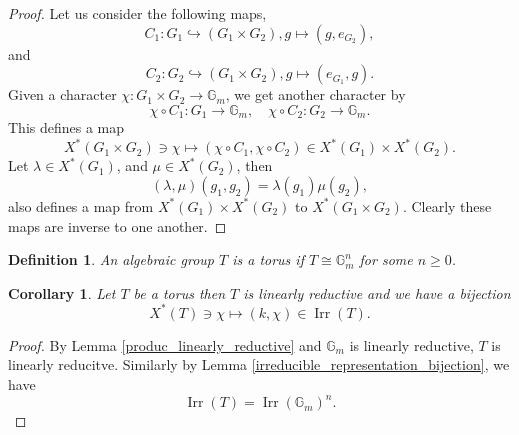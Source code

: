 \documentclass[10pt]{article}
\newtheorem{definition}{Definition}[section]
\newtheorem{corollary}{Corollary} [section]
\numberwithin{equation}{theorem}
\DeclareMathOperator{\Irr}{Irr}
\newcommand{\G}[0]{\mathbb{G}}
\begin{document}
\begin{proof}
  Let us consider the following maps,
  \begin{equation*}
    C_1:G_1\hookrightarrow(G_1\times G_2), g\mapsto (g,e_{G_2}),
  \end{equation*}
  and 
  \begin{equation*}
    C_2:G_2\hookrightarrow(G_1\times G_2), g\mapsto (e_{G_1},g).
  \end{equation*}
  Given a character $\chi:G_1\times G_2\to \G_m$, we get another character by 
  \begin{equation*}
    \chi\circ C_1:G_1\to\G_m,\quad \chi\circ C_2:G_2\to\G_m.
  \end{equation*}
  This defines a map 
  \begin{equation*}
    X^*(G_1\times G_2)\ni\chi\mapsto (\chi\circ C_1,\chi\circ C_2)\in X^*(G_1)\times X^*(G_2).
  \end{equation*}
  Let $\lambda\in X^*(G_1)$, and $\mu\in X^*(G_2)$, then 
  \begin{equation*}
    (\lambda,\mu)(g_1,g_2) = \lambda(g_1)\mu(g_2),
  \end{equation*}
  also defines a map from $X^*(G_1)\times X^*(G_2)$ to $X^*(G_1\times G_2)$. Clearly these maps are inverse to one another.%
\end{proof}
\begin{definition}
  An algebraic group $T$ is a torus if $T\cong\G_m^n$ for some $n\geq 0$. 
\end{definition}
\begin{corollary}
  Let $T$ be a torus then $T$ is linearly reductive and we have a bijection
  \begin{equation*}
    X^*(T)\ni\chi\mapsto (k,\chi)\in\Irr(T).
  \end{equation*}
\end{corollary}
\begin{proof}
  By Lemma \ref{produc_linearly_reductive} and $\G_m$ is linearly reductive, $T$ is linearly reducitve. Similarly by Lemma \ref{irreducible_representation_bijection}, we have 
  \begin{equation*}
    \Irr(T) = \Irr(\G_m)^n.
  \end{equation*}
\end{proof}
\end{document}

